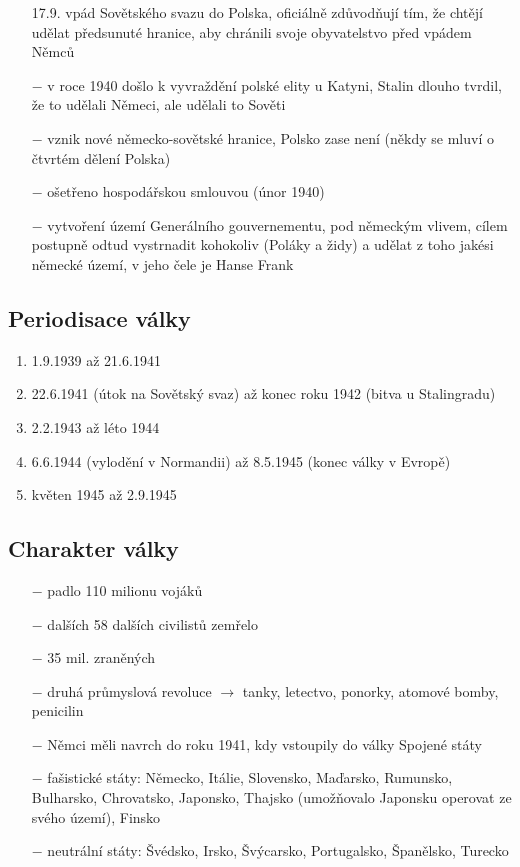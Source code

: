 \documentclass{article}
\begin{document}
\begin{itemize}
    \item[17.9.] vpád Sovětského svazu do Polska, oficiálně zdůvodňují tím, že chtějí udělat předsunuté hranice, aby chránili svoje obyvatelstvo před vpádem Němců
    \item[$-$] v roce 1940 došlo k vyvraždění polské elity u Katyni, Stalin dlouho tvrdil, že to udělali Němeci, ale udělali to Sověti
    \item[$-$] vznik nové německo-sovětské hranice, Polsko zase není (někdy se mluví o čtvrtém dělení Polska)
    \item[$-$] ošetřeno hospodářskou smlouvou (únor 1940)
    \item[$-$] vytvoření území Generálního gouvernementu, pod německým vlivem, cílem postupně odtud vystrnadit kohokoliv (Poláky a židy) a udělat z toho jakési německé území, v jeho čele je Hanse Frank

\end{itemize}

\subsection*{Periodisace války}
\begin{enumerate}
    \vspace{-0.5em}
    \setlength\itemsep{0.15em}
    \item 1.9.1939 až 21.6.1941
    \item 22.6.1941 (útok na Sovětský svaz) až konec roku 1942 (bitva u Stalingradu)
    \item 2.2.1943 až léto 1944
    \item 6.6.1944 (vylodění v Normandii) až 8.5.1945 (konec války v Evropě)
    \item květen 1945 až 2.9.1945
\end{enumerate}

\subsection*{Charakter války}

\begin{itemize}
    \vspace{-0.5em}
    \setlength\itemsep{0.15em}
    \item[$-$] padlo 110 milionu vojáků
    \item[$-$] dalších 58 dalších civilistů zemřelo
    \item[$-$] 35 mil. zraněných
    \item[$-$] druhá průmyslová revoluce $\rightarrow$ tanky, letectvo, ponorky, atomové bomby, penicilin
    \item[$-$] Němci měli navrch do roku 1941, kdy vstoupily do války Spojené státy
    \item[$-$] fašistické státy: Německo, Itálie, Slovensko, Maďarsko, Rumunsko, Bulharsko, Chrovatsko, Japonsko, Thajsko (umožňovalo Japonsku operovat ze svého území), Finsko
    \item[$-$] neutrální státy: Švédsko, Irsko, Švýcarsko, Portugalsko, Španělsko, Turecko
\end{itemize}
\end{document}
